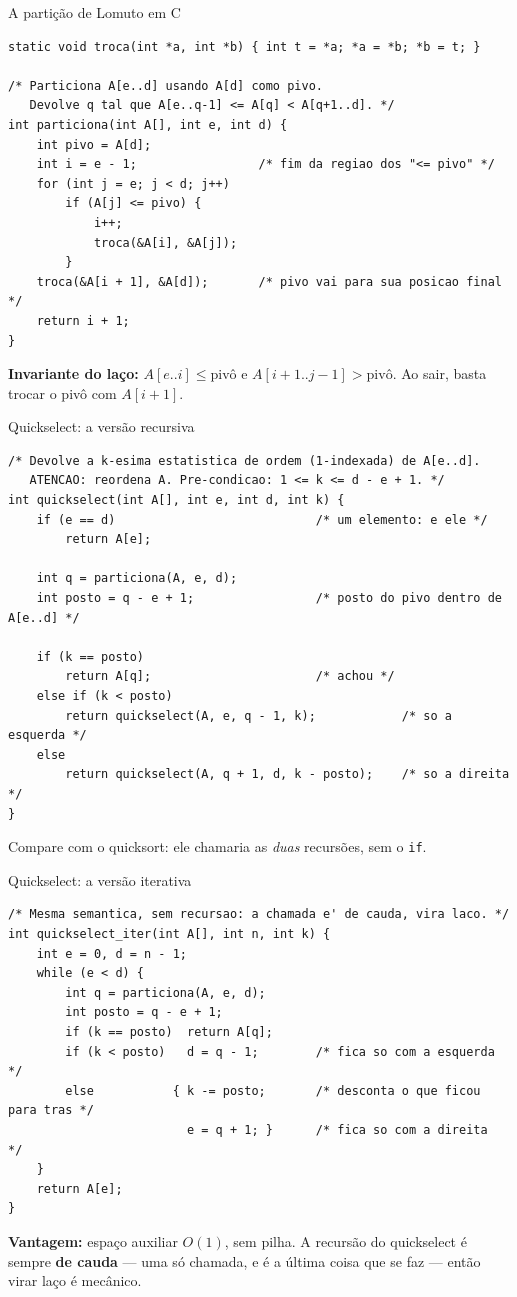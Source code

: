 \documentclass[aspectratio=169]{beamer}
\begin{document}
\begin{frame}[fragile,shrink=20]{A partição de Lomuto em C}
\begin{lstlisting}
static void troca(int *a, int *b) { int t = *a; *a = *b; *b = t; }

/* Particiona A[e..d] usando A[d] como pivo.
   Devolve q tal que A[e..q-1] <= A[q] < A[q+1..d]. */
int particiona(int A[], int e, int d) {
    int pivo = A[d];
    int i = e - 1;                 /* fim da regiao dos "<= pivo" */
    for (int j = e; j < d; j++)
        if (A[j] <= pivo) {
            i++;
            troca(&A[i], &A[j]);
        }
    troca(&A[i + 1], &A[d]);       /* pivo vai para sua posicao final */
    return i + 1;
}
\end{lstlisting}

  \textbf{Invariante do laço:}
  $A[e..i] \le \text{pivô}$ \; e \; $A[i+1..j-1] > \text{pivô}$.
  Ao sair, basta trocar o pivô com $A[i+1]$.
\end{frame}

\begin{frame}[fragile,shrink=20]{Quickselect: a versão recursiva}
\begin{lstlisting}
/* Devolve a k-esima estatistica de ordem (1-indexada) de A[e..d].
   ATENCAO: reordena A. Pre-condicao: 1 <= k <= d - e + 1. */
int quickselect(int A[], int e, int d, int k) {
    if (e == d)                            /* um elemento: e ele */
        return A[e];

    int q = particiona(A, e, d);
    int posto = q - e + 1;                 /* posto do pivo dentro de A[e..d] */

    if (k == posto)
        return A[q];                       /* achou */
    else if (k < posto)
        return quickselect(A, e, q - 1, k);            /* so a esquerda */
    else
        return quickselect(A, q + 1, d, k - posto);    /* so a direita */
}
\end{lstlisting}

  \begin{center}
    \small Compare com o quicksort: ele chamaria as \emph{duas} recursões,
    sem o \texttt{if}.
  \end{center}
\end{frame}

\begin{frame}[fragile]{Quickselect: a versão iterativa}
\begin{lstlisting}
/* Mesma semantica, sem recursao: a chamada e' de cauda, vira laco. */
int quickselect_iter(int A[], int n, int k) {
    int e = 0, d = n - 1;
    while (e < d) {
        int q = particiona(A, e, d);
        int posto = q - e + 1;
        if (k == posto)  return A[q];
        if (k < posto)   d = q - 1;        /* fica so com a esquerda */
        else           { k -= posto;       /* desconta o que ficou para tras */
                         e = q + 1; }      /* fica so com a direita  */
    }
    return A[e];
}
\end{lstlisting}

  \textbf{Vantagem:} espaço auxiliar $O(1)$, sem pilha. A recursão do
  quickselect é sempre \textbf{de cauda} --- uma só chamada, e é a última coisa
  que se faz --- então virar laço é mecânico.
\end{frame}
\end{document}
